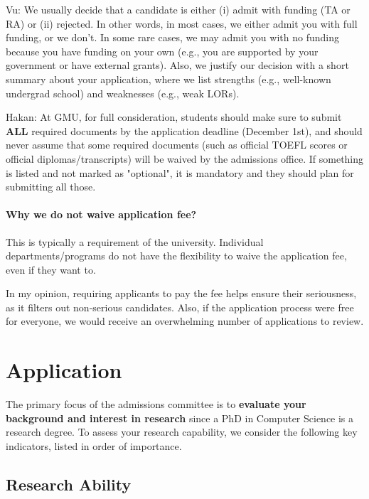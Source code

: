 \documentclass[11pt]{article}
\begin{document}
\begin{tcolorbox}[left=1pt,right=1pt,top=1pt,bottom=1pt]
Vu: We usually decide that a candidate is either (i) admit with funding (TA or RA) or (ii) rejected. In other words, in most cases, we either
admit you with full funding, or we don't. In some rare cases, we may admit
you with no funding because you have funding on your own (e.g., you are
supported by your government or have external grants). Also, we justify
our decision with a short summary about your application, where we list
strengths (e.g., well-known undergrad school) and weaknesses (e.g., weak
LORs).
\end{tcolorbox}

\begin{tcolorbox}[left=1pt,right=1pt,top=1pt,bottom=1pt]
    Hakan: At GMU, for full consideration, students should make sure to submit \textbf{ALL} required documents by the application deadline (December 1st), and should never assume that some required documents (such as official TOEFL scores or official diplomas/transcripts) will be waived by the admissions office. If something is listed and not marked as "optional", it is mandatory and they should plan for submitting all those.  
\end{tcolorbox}
\paragraph{Why we do not waive application fee?}  This is typically a requirement of the university. Individual departments/programs do not have the flexibility to waive the application fee, even if they want to. 

In my opinion, requiring applicants to pay the fee helps ensure their seriousness, as it filters out non-serious candidates. Also, if the application process were free for everyone, we would receive an overwhelming number of applications to review.


\section{Application}\label{sec:application}

The primary focus of the admissions committee is to \textbf{evaluate your background and interest in research} since a PhD in Computer Science
is a research degree. To assess your research capability, we consider
the following key indicators, listed in order of importance.

\subsection{Research Ability}
\end{document}
